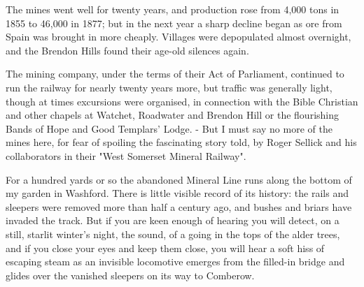 The mines went well for twenty years, and production rose from 4,000 tons in 1855 to 46,000 in 1877; but in the next year a sharp decline began as ore from Spain was brought in more cheaply. Villages were depopulated almost overnight, and the Brendon Hills found their age-old silences again.

The mining company, under the terms of their Act of Parliament, continued to run the railway for nearly twenty years more, but traffic was generally light, though at times excursions were organised, in connection with the Bible Christian and other chapels at Watchet, Roadwater and Brendon Hill or the flourishing Bands of Hope and Good Templars' Lodge. - But I must say no more of the mines here, for fear of spoiling the fascinating story told, by Roger Sellick and his collaborators in their "West Somerset Mineral Railway".
 
\Flourish 
 
For a hundred yards or so the abandoned Mineral Line runs along the bottom of my garden in Washford. There is little visible record of its history: the rails and sleepers were removed more than half a century ago, and bushes and briars have invaded the track. But if you are keen enough of hearing you will detect, on a still, starlit winter’s night, the sound, of a going in the tops of the alder trees, and if you close your eyes and keep them close, you will hear a soft hiss of escaping steam as an invisible locomotive emerges from the filled-in bridge and glides over the vanished sleepers on its way to Comberow.